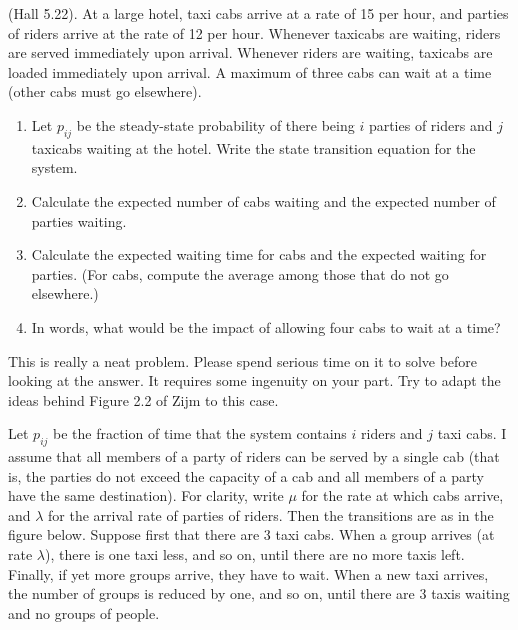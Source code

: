 \begin{exercise}{\faPhoto}
  (Hall 5.22). At a large hotel, taxi cabs arrive at a rate of 15 per
  hour, and parties of riders arrive at the rate of 12 per
  hour. Whenever taxicabs are waiting, riders are served immediately
  upon arrival. Whenever riders are waiting, taxicabs are loaded
  immediately upon arrival. A maximum of three cabs can wait at a time (other cabs must go elsewhere).
  \begin{enumerate}
  \item Let $p_{ij}$ be the steady-state probability of there being $i$ parties of riders and $j$ taxicabs waiting at the hotel. Write the state transition equation for the system. 
  \item Calculate the expected number of cabs waiting and the expected number of parties waiting.
  \item Calculate the expected waiting time for cabs and the expected waiting for parties. (For cabs, compute the average among those that do not go elsewhere.)
  \item In words, what would be the impact of allowing four cabs to wait at a time?
  \end{enumerate}
  \begin{hint}
This is really a neat problem. Please spend serious time on it to
solve before looking at the answer. It requires some ingenuity on your part.  Try to adapt the ideas behind Figure 2.2 of Zijm to this case.
  \end{hint}
    \begin{solution}
Let $p_{ij}$ be the fraction of time that the system contains $i$
riders and $j$ taxi cabs. I assume that all members of a party of
riders can be served by a single cab (that is, the parties do not
exceed the capacity of a cab and all members of a party have the same
destination). For clarity, write $\mu$ for the rate at which cabs
arrive, and $\lambda$ for the arrival rate of parties of riders.  Then
the transitions are as in the figure below. Suppose first that there
are $3$ taxi cabs. When a group arrives (at rate $\lambda$), there is
one taxi less, and so on, until there are no more taxis
left. Finally, if yet more groups arrive, they have to wait. When a
new taxi arrives, the number of groups is reduced by one, and so on,
until there are $3$ taxis waiting and no groups of people.


    \begin{center}

\end{center}
\end{solution}
\end{exercise}
